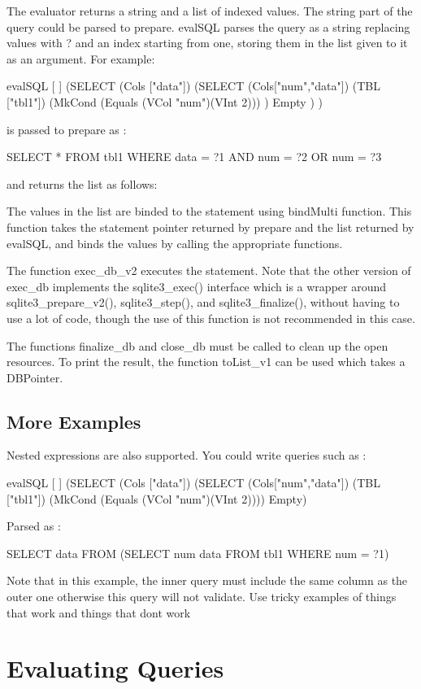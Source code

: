\documentclass[11pt]{article}
\begin{document}
The evaluator returns a string and a list of indexed values. The string part of the query could be parsed to prepare. 
evalSQL parses the query as a string replacing values with ? and an index starting from one, storing them in the list given to it as an argument.
For example:


evalSQL [ ] (SELECT (Cols ["data"]) (SELECT (Cols["num","data"]) (TBL ["tbl1"]) (MkCond (Equals (VCol "num")(VInt 2))) ) Empty ) )

is passed to prepare as :

SELECT * FROM tbl1 WHERE data = ?1 AND num = ?2 OR num = ?3

and returns the list as follows:

The values in the list are binded to the statement using bindMulti function. This function takes the statement pointer returned by prepare and the list returned by evalSQL, and binds the values by calling the appropriate functions.

The function exec\_db\_v2 executes the statement. Note that the other version of exec\_db implements the sqlite3\_exec() interface which is a wrapper around sqlite3\_prepare\_v2(), sqlite3\_step(), and sqlite3\_finalize(), without having to use a lot of code, though the use of this function is not recommended in this case.

The functions finalize\_db and close\_db must be called to clean up the open resources.
To print the result, the function toList\_v1 can be used which takes a DBPointer.

\subsection{More Examples}
\label{More Examples}
Nested expressions are also supported. You could write queries such as :

evalSQL [ ] (SELECT (Cols ["data"]) (SELECT (Cols["num","data"]) (TBL ["tbl1"]) (MkCond (Equals (VCol "num")(VInt 2)))) Empty)

Parsed as :

SELECT data FROM (SELECT num data FROM tbl1 WHERE num = ?1)

Note that in this example, the inner query must include the same column as the outer one otherwise this query will not validate.
Use tricky examples of things that work and things that dont work

\section{Evaluating Queries}
\label{Evaluating Queries}
\end{document}
